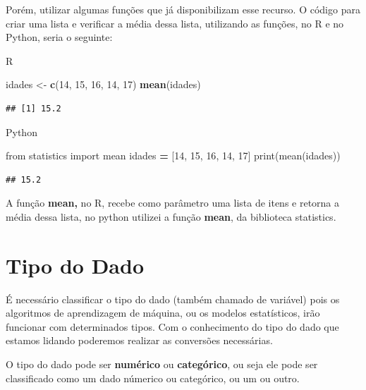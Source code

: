 \documentclass[
]{book}
\newenvironment{Shaded}{\begin{snugshade}}{\end{snugshade}}
\newcommand{\BuiltInTok}[1]{#1}
\newcommand{\DecValTok}[1]{\textcolor[rgb]{0.00,0.00,0.81}{#1}}
\newcommand{\FunctionTok}[1]{\textcolor[rgb]{0.13,0.29,0.53}{\textbf{#1}}}
\newcommand{\ImportTok}[1]{#1}
\newcommand{\NormalTok}[1]{#1}
\newcommand{\OperatorTok}[1]{\textcolor[rgb]{0.81,0.36,0.00}{\textbf{#1}}}
\newcommand{\OtherTok}[1]{\textcolor[rgb]{0.56,0.35,0.01}{#1}}
\begin{document}
Porém, utilizar algumas funções que já disponibilizam esse recurso. O código para criar uma lista e verificar a média dessa lista, utilizando as funções, no R e no Python, seria o seguinte:

R

\begin{Shaded}
\begin{Highlighting}[]
\NormalTok{idades }\OtherTok{\textless{}{-}} \FunctionTok{c}\NormalTok{(}\DecValTok{14}\NormalTok{, }\DecValTok{15}\NormalTok{, }\DecValTok{16}\NormalTok{, }\DecValTok{14}\NormalTok{, }\DecValTok{17}\NormalTok{)}
\FunctionTok{mean}\NormalTok{(idades)}
\end{Highlighting}
\end{Shaded}

\begin{verbatim}
## [1] 15.2
\end{verbatim}

Python

\begin{Shaded}
\begin{Highlighting}[]
\ImportTok{from}\NormalTok{ statistics }\ImportTok{import}\NormalTok{ mean }
\NormalTok{idades }\OperatorTok{=}\NormalTok{ [}\DecValTok{14}\NormalTok{, }\DecValTok{15}\NormalTok{, }\DecValTok{16}\NormalTok{, }\DecValTok{14}\NormalTok{, }\DecValTok{17}\NormalTok{]}
\BuiltInTok{print}\NormalTok{(mean(idades))}
\end{Highlighting}
\end{Shaded}

\begin{verbatim}
## 15.2
\end{verbatim}

A função \textbf{mean,} no R, recebe como parâmetro uma lista de itens e retorna a média dessa lista, no python utilizei a função \textbf{mean}, da biblioteca statistics.

\hypertarget{tipo-do-dado}{%
\section{Tipo do Dado}\label{tipo-do-dado}}

É necessário classificar o tipo do dado (também chamado de variável) pois os algoritmos de aprendizagem de máquina, ou os modelos estatísticos, irão funcionar com determinados tipos. Com o conhecimento do tipo do dado que estamos lidando poderemos realizar as conversões necessárias.

O tipo do dado pode ser \textbf{numérico} ou \textbf{categórico}, ou seja ele pode ser classificado como um dado númerico ou categórico, ou um ou outro.
\end{document}
